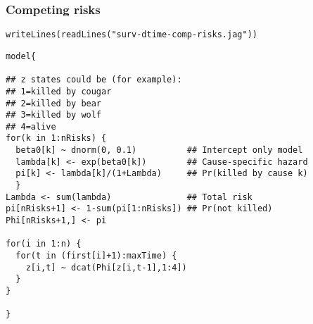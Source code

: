 \documentclass[color=usenames,dvipsnames]{beamer}\usepackage[]{graphicx}\usepackage[]{xcolor}
\makeatletter
\newcommand{\hlsng}[1]{\textcolor[rgb]{0.749,0.012,0.012}{#1}}%
\newcommand{\hldef}[1]{\textcolor[rgb]{0,0,0}{#1}}%
\newcommand{\hlkwd}[1]{\textcolor[rgb]{0.004,0.004,0.506}{#1}}%
\newenvironment{kframe}{%
 \def\at@end@of@kframe{}%
 \ifinner\ifhmode%
  \def\at@end@of@kframe{\end{minipage}}%
  \begin{minipage}{\columnwidth}%
 \fi\fi%
 \def\FrameCommand##1{\hskip\@totalleftmargin \hskip-\fboxsep
 \colorbox{shadecolor}{##1}\hskip-\fboxsep
     \hskip-\linewidth \hskip-\@totalleftmargin \hskip\columnwidth}%
 \MakeFramed {\advance\hsize-\width
   \@totalleftmargin\z@ \linewidth\hsize
   \@setminipage}}%
 {\par\unskip\endMakeFramed%
 \at@end@of@kframe}
\newenvironment{knitrout}{}{} %
\makeatother
\begin{document}
\begin{frame}[fragile]
  \frametitle{Competing risks}
\begin{knitrout}\scriptsize
{}\color{fgcolor}\begin{kframe}
\begin{alltt}
\hlkwd{writeLines}\hldef{(}\hlkwd{readLines}\hldef{(}\hlsng{"surv-dtime-comp-risks.jag"}\hldef{))}
\end{alltt}
\end{kframe}
\end{knitrout}
\vspace{-6pt}
\begin{knitrout}\scriptsize
{}\color{fgcolor}\begin{kframe}
\begin{verbatim}
model{

## z states could be (for example):
## 1=killed by cougar
## 2=killed by bear
## 3=killed by wolf
## 4=alive
for(k in 1:nRisks) {
  beta0[k] ~ dnorm(0, 0.1)          ## Intercept only model
  lambda[k] <- exp(beta0[k])        ## Cause-specific hazard
  pi[k] <- lambda[k]/(1+Lambda)     ## Pr(killed by cause k)
  }
Lambda <- sum(lambda)               ## Total risk
pi[nRisks+1] <- 1-sum(pi[1:nRisks]) ## Pr(not killed)
Phi[nRisks+1,] <- pi

for(i in 1:n) {
  for(t in (first[i]+1):maxTime) {
    z[i,t] ~ dcat(Phi[z[i,t-1],1:4])
  }
}

}
\end{verbatim}
\end{kframe}
\end{knitrout}
\end{frame}
\end{document}
